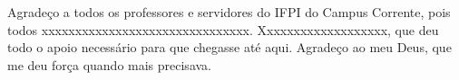 \begin{agradecimentos}
Agradeço a todos os professores e servidores do IFPI do Campus Corrente, pois todos xxxxxxxxxxxxxxxxxxxxxxxxxxxxxxx. Xxxxxxxxxxxxxxxxxxx, que deu todo o apoio necessário para que chegasse até aqui. Agradeço ao meu Deus, que me deu força quando mais precisava.
\end{agradecimentos}